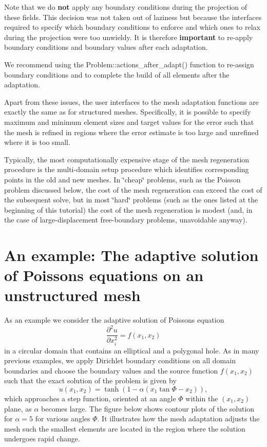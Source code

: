 \begin{DoxyItemize}
\item Note that we do {\bfseries not} apply any boundary conditions during the projection of these fields. This decision was not taken out of laziness but because the interfaces required to specify which boundary conditions to enforce and which ones to relax during the projection were too unwieldy. It is therefore {\bfseries important} to re-\/apply boundary conditions and boundary values after each adaptation. ~\newline
~\newline

\end{DoxyItemize}We recommend using the {\ttfamily Problem\+::actions\+\_\+after\+\_\+adapt()} function to re-\/assign boundary conditions and to complete the build of all elements after the adaptation.

Apart from these issues, the user interfaces to the mesh adaptation functions are exactly the same as for structured meshes. Specifically, it is possible to specify maximum and minimum element sizes and target values for the error such that the mesh is refined in regions where the error estimate is {\ttfamily too large\textquotesingle{}\textquotesingle{} and unrefined where it is }too small\textquotesingle{}\textquotesingle{}.

Typically, the most computationally expensive stage of the mesh regeneration procedure is the multi-\/domain setup procedure which identifies corresponding points in the old and new meshes. In \char`\"{}cheap\char`\"{} problems, such as the Poisson problem discussed below, the cost of the mesh regeneration can exceed the cost of the subsequent solve, but in most \char`\"{}hard\char`\"{} problems (such as the ones listed at the beginning of this tutorial) the cost of the mesh regeneration is modest (and, in the case of large-\/displacement free-\/boundary problems, unavoidable anyway).



 

\hypertarget{index_example}{}\section{An example\+: The adaptive solution of Poisson\textquotesingle{}s equations on an unstructured mesh}\label{index_example}
As an example we consider the adaptive solution of Poisson\textquotesingle{}s equation \[ \frac{\partial^2 u}{\partial x_i^2} = f(x_1,x_2) \] in a circular domain that contains an elliptical and a polygonal hole. As in many previous examples, we apply Dirichlet boundary conditions on all domain boundaries and choose the boundary values and the source function $ f(x_1,x_2) $ such that the exact solution of the problem is given by \[ u(x_1,x_2) = \tanh(1-\alpha(x_1 \tan\Phi - x_2)), \] which approaches a step function, oriented at an angle $ \Phi $ within the $ (x_1,x_2) $ plane, as $ \alpha $ becomes large. The figure below shows contour plots of the solution for $ \alpha = 5 $ for various angles $ \Phi $. It illustrates how the mesh adaptation adjusts the mesh such the smallest elements are located in the region where the solution undergoes rapid change.

